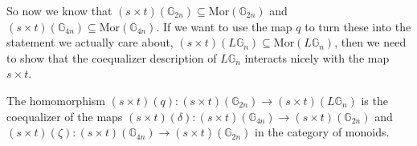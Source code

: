 So now we know that $(s \times t)(\mathbb{G}_{2n}) \subseteq \mathrm{Mor}(\mathbb{G}_{2n})$ and $(s \times t)(\mathbb{G}_{4n}) \subseteq \mathrm{Mor}(\mathbb{G}_{4n})$. If we want to use the map $q$ to turn these into the statement we actually care about, $(s \times t)(L\mathbb{G}_n) \subseteq \mathrm{Mor}(L\mathbb{G}_n)$, then we need to show that the coequalizer description of $L\mathbb{G}_n$ interacts nicely with the map $s \times t$.

\begin{prop} The homomorphism $(s \times t)(q): (s \times t)(\mathbb{G}_{2n}) \to (s \times t)(L\mathbb{G}_n)$ is the coequalizer of the maps $(s \times t)(\delta) : (s \times t)(\mathbb{G}_{4n}) \to (s \times t)(\mathbb{G}_{2n})$ and $(s \times t)(\zeta): (s \times t)(\mathbb{G}_{4n}) \to (s \times t)(\mathbb{G}_{2n})$ in the category of monoids.
\end{prop}
